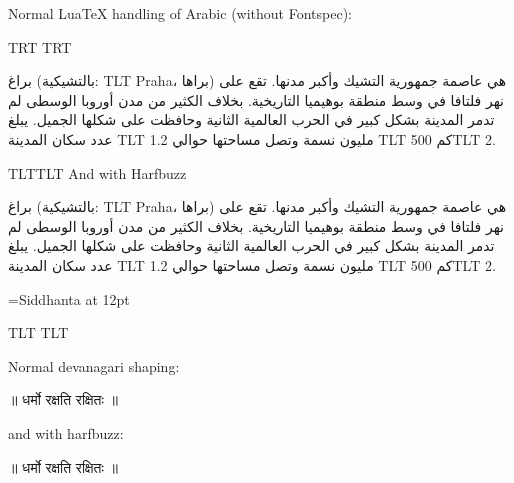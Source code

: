 \documentclass{article}
\newcommand\textlatin[1]{\bgroup\luatextextdir TLT #1\egroup}
\begin{document}
\arab 

Normal LuaTeX handling of Arabic (without Fontspec):

\luatextextdir TRT
\luatexpardir TRT

براغ (بالتشيكية: \textlatin{Praha}، براها) هي عاصمة جمهورية التشيك وأكبر مدنها. تقع على نهر فلتافا في وسط منطقة بوهيميا التاريخية. بخلاف الكثير من مدن أوروبا الوسطى لم تدمر المدينة بشكل كبير في الحرب العالمية الثانية وحافظت على شكلها الجميل. يبلغ عدد سكان المدينة \textlatin{1.2} مليون نسمة وتصل مساحتها حوالي \textlatin{500} كم\textlatin{2.}

\startharfbuzz

{\luatexpardir TLT\textlatin{And with Harfbuzz}}

براغ (بالتشيكية: \textlatin{Praha}، براها) هي عاصمة جمهورية التشيك وأكبر مدنها. تقع على نهر فلتافا في وسط منطقة بوهيميا التاريخية. بخلاف الكثير من مدن أوروبا الوسطى لم تدمر المدينة بشكل كبير في الحرب العالمية الثانية وحافظت على شكلها الجميل. يبلغ عدد سكان المدينة \textlatin{1.2} مليون نسمة وتصل مساحتها حوالي \textlatin{500} كم\textlatin{2.}


\font\siddhanta={Siddhanta} at 12pt
\bigskip

\siddhanta 

\stopharfbuzz
\luatextextdir TLT
\luatexpardir TLT

Normal devanagari shaping: 

॥ धर्मो रक्षति रक्षितः ॥

\startharfbuzz

and with harfbuzz: 


॥ धर्मो रक्षति रक्षितः ॥
\end{document}
